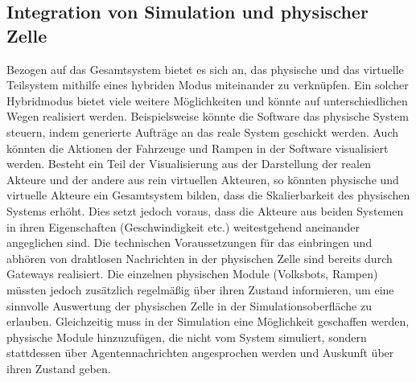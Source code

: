 \subsection{Integration von Simulation und physischer Zelle}
\label{sec:Hybrid}
Bezogen auf das Gesamtsystem bietet es sich an, das physische und das virtuelle Teilsystem mithilfe eines hybriden Modus miteinander zu verknüpfen. Ein solcher Hybridmodus bietet viele weitere Möglichkeiten und könnte auf unterschiedlichen Wegen realisiert werden. Beispielsweise könnte die Software das physische System steuern, indem generierte Aufträge an das reale System geschickt werden. Auch könnten die Aktionen der Fahrzeuge und Rampen in der Software visualisiert werden. Besteht ein Teil der Visualisierung aus der Darstellung der realen Akteure und der andere aus rein virtuellen Akteuren, so könnten physische und virtuelle Akteure ein Gesamtsystem bilden, dass die Skalierbarkeit des physischen Systems erhöht. Dies setzt jedoch voraus, dass die Akteure aus beiden Systemen in ihren Eigenschaften (Geschwindigkeit etc.) weitestgehend aneinander angeglichen sind. Die technischen Voraussetzungen für das einbringen und abhören von drahtlosen Nachrichten in der physischen Zelle sind bereits durch Gateways realisiert. Die einzelnen physischen Module (Volksbots, Rampen) müssten jedoch zusätzlich regelmäßig über ihren Zustand informieren, um eine sinnvolle Auswertung der physischen Zelle in der Simulationsoberfläche zu erlauben. Gleichzeitig muss in der Simulation eine Möglichkeit geschaffen werden, physische Module hinzuzufügen, die nicht vom System simuliert, sondern stattdessen über Agentennachrichten angesprochen werden und Auskunft über ihren Zustand geben.